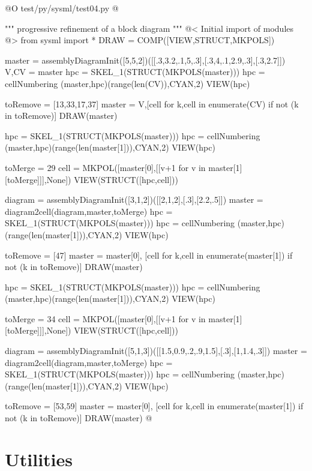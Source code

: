 \documentclass[11pt,oneside]{article}	%
\begin{document}
@O test/py/sysml/test04.py
@{""" progressive refinement of a block diagram """
@< Initial import of modules @>
from sysml import *
DRAW = COMP([VIEW,STRUCT,MKPOLS])

master = assemblyDiagramInit([5,5,2])([[.3,3.2,.1,5,.3],[.3,4,.1,2.9,.3],[.3,2.7]])
V,CV = master
hpc = SKEL_1(STRUCT(MKPOLS(master)))
hpc = cellNumbering (master,hpc)(range(len(CV)),CYAN,2)
VIEW(hpc)

toRemove = [13,33,17,37]
master = V,[cell for k,cell in enumerate(CV) if not (k in toRemove)]
DRAW(master)

hpc = SKEL_1(STRUCT(MKPOLS(master)))
hpc = cellNumbering (master,hpc)(range(len(master[1])),CYAN,2)
VIEW(hpc)

toMerge = 29
cell = MKPOL([master[0],[[v+1 for v in  master[1][toMerge]]],None])
VIEW(STRUCT([hpc,cell]))

diagram = assemblyDiagramInit([3,1,2])([[2,1,2],[.3],[2.2,.5]])
master = diagram2cell(diagram,master,toMerge)
hpc = SKEL_1(STRUCT(MKPOLS(master)))
hpc = cellNumbering (master,hpc)(range(len(master[1])),CYAN,2)
VIEW(hpc)

toRemove = [47]
master = master[0], [cell for k,cell in enumerate(master[1]) if not (k in toRemove)]
DRAW(master)

hpc = SKEL_1(STRUCT(MKPOLS(master)))
hpc = cellNumbering (master,hpc)(range(len(master[1])),CYAN,2)
VIEW(hpc)

toMerge = 34
cell = MKPOL([master[0],[[v+1 for v in  master[1][toMerge]]],None])
VIEW(STRUCT([hpc,cell]))

diagram = assemblyDiagramInit([5,1,3])([[1.5,0.9,.2,.9,1.5],[.3],[1,1.4,.3]])
master = diagram2cell(diagram,master,toMerge)
hpc = SKEL_1(STRUCT(MKPOLS(master)))
hpc = cellNumbering (master,hpc)(range(len(master[1])),CYAN,2)
VIEW(hpc)

toRemove = [53,59]
master = master[0], [cell for k,cell in enumerate(master[1]) if not (k in toRemove)]
DRAW(master)
@}


\appendix
\section{Utilities}
\end{document}

